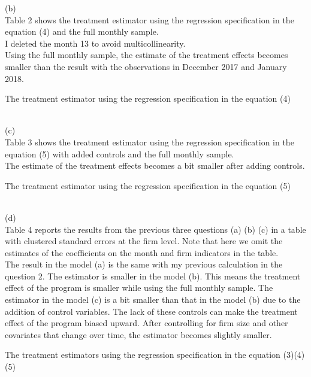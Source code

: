 \documentclass{article}
\begin{document}
(b)
\smallskip
\\
Table 2 shows the treatment estimator using the regression specification in the equation (4) and the full monthly sample.
\\
I deleted the month 13 to avoid multicollinearity. 
\\
Using the full monthly sample, the estimate of the treatment effects becomes smaller than the result with the observations in December 2017 and January 2018. 
\begin{table}[h]
    \centering
    
    \caption{The treatment estimator using the regression specification in the equation (4)}
    \label{tab:Q3_b}
\end{table}
\bigskip
\\
(c)
\smallskip
\\
Table 3 shows the treatment estimator using the regression specification in the equation (5) with added controls and the full monthly sample.
\\ The estimate of the treatment effects becomes a bit smaller after adding controls.
\begin{table}[h]
    \centering
    
    \caption{The treatment estimator using the regression specification in the equation (5)}
    \label{tab:Q3_c}
\end{table}
\bigskip
\\
(d)
\smallskip
\\
Table 4 reports the results from the previous three questions (a) (b) (c) in a table with clustered standard errors at the firm level. Note that here we omit the estimates of the coefficients on the month and firm indicators in the table. 
\smallskip
\\
The result in the model (a) is the same with my previous calculation in the question 2. The estimator is smaller in the model (b). This means the treatment effect of the program is smaller while using the full monthly sample. The estimator in the model (c) is a bit smaller than that in the model (b) due to the addition of control variables. The lack of these controls can make the treatment effect of the program biased upward. After controlling for firm size and other covariates that change over time, the estimator becomes slightly smaller.  
\begin{table}[h]
    \centering
    
    \caption{The treatment estimators using the regression specification in the equation (3)(4)(5)}
    \label{tab:Q3_d}
\end{table}
\end{document}
